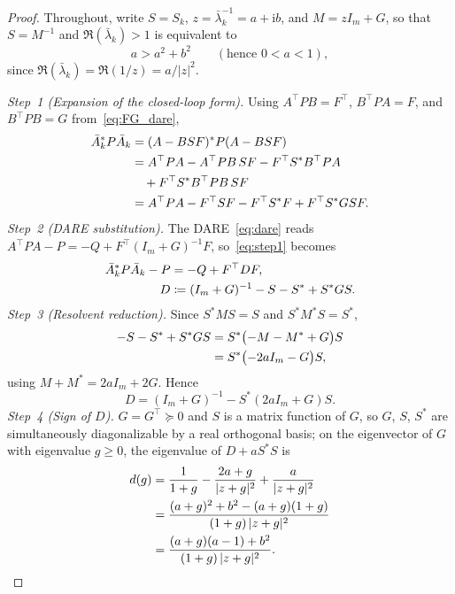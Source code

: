 \documentclass[final,5p,times]{elsarticle}
\theoremstyle{plain}
\theoremstyle{definition}
\theoremstyle{remark}
\begin{document}
\begin{proof}
Throughout, write $S = S_k$, $z = \bar\lambda_k^{-1} = a + \mathrm{i}b$, and $M = zI_m + G$, so that $S = M^{-1}$ and $\Re(\bar\lambda_k) > 1$ is equivalent to
\begin{equation}
a > a^2 + b^2 \qquad (\text{hence } 0 < a < 1),
\label{eq:acond}
\end{equation}
since $\Re(\bar\lambda_k) = \Re(1/z) = a/|z|^2$.

\emph{Step~1 (Expansion of the closed-loop form).} Using $A^\top P B = F^\top$, $B^\top P A = F$, and $B^\top P B = G$ from~\eqref{eq:FG_dare},
\begin{align}
\bar{A}_k^* P \bar{A}_k
&= (A - BSF)^* P (A - BSF) \notag\\
&= A^\top P A - A^\top P B\, S F - F^\top S^* B^\top P A \notag\\
&\quad + F^\top S^* B^\top P B\, S F \notag\\
&= A^\top P A - F^\top S F - F^\top S^* F + F^\top S^* G S F.
\label{eq:step1}
\end{align}
\emph{Step~2 (DARE substitution).} The DARE~\eqref{eq:dare} reads $A^\top P A - P = -Q + F^\top (I_m + G)^{-1} F$, so~\eqref{eq:step1} becomes
\begin{align}
\bar{A}_k^* P \bar{A}_k - P
&= -Q + F^\top D F, \label{eq:step2}\\
D &\coloneqq (I_m+G)^{-1} - S - S^* + S^* G S. \notag
\end{align}
\emph{Step~3 (Resolvent reduction).} Since $S^* M S = S$ and $S^* M^* S = S^*$,
\begin{align}
-S - S^* + S^* G S
&= S^*\big({-}M - M^* + G\big)S \notag\\
&= S^*\big({-}2aI_m - G\big)S, \label{eq:step3}
\end{align}
using $M + M^* = 2aI_m + 2G$. Hence
\begin{equation}
D = (I_m+G)^{-1} - S^*(2aI_m + G)S.
\label{eq:Dform}
\end{equation}
\emph{Step~4 (Sign of $D$).} $G = G^\top \succeq 0$ and $S$ is a matrix function of $G$, so $G$, $S$, $S^*$ are simultaneously diagonalizable by a real orthogonal basis; on the eigenvector of $G$ with eigenvalue $g \geq 0$, the eigenvalue of $D + a S^* S$ is
\begin{align}
d(g) &= \frac{1}{1+g} - \frac{2a+g}{|z+g|^2} + \frac{a}{|z+g|^2} \notag\\
&= \frac{(a+g)^2 + b^2 - (a+g)(1+g)}{(1+g)\,|z+g|^2} \notag\\
&= \frac{(a+g)(a-1) + b^2}{(1+g)\,|z+g|^2}.

\end{align}
\end{proof}
\end{document}

